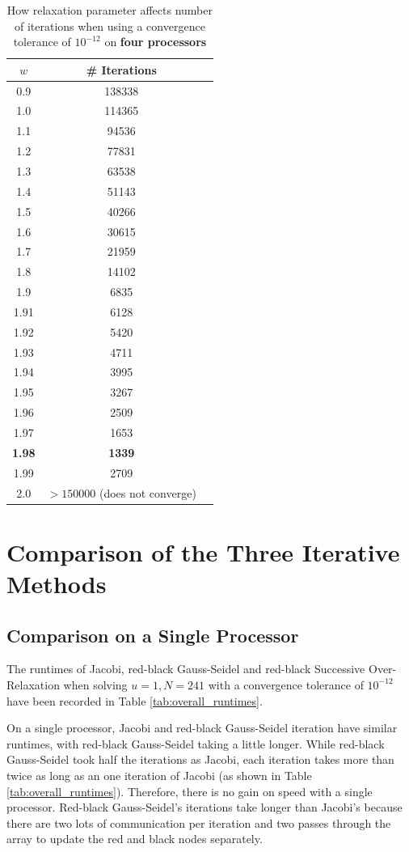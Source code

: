 \documentclass{article}
\begin{document}
\begin{table}
	\centering
	\begin{tabular}{|c|c|c|}
		\hline
		\textbf{$w$} & \textbf{\# Iterations} \\
		\hline
		0.9 & 138338 \\
		1.0 & 114365 \\
		1.1 & 94536 \\
		1.2 & 77831 \\
		1.3 & 63538 \\
		1.4 & 51143 \\
		1.5 & 40266 \\
		1.6 & 30615 \\
		1.7 & 21959 \\
		1.8 & 14102 \\
		1.9 & 6835 \\
		1.91 & 6128 \\
		1.92 & 5420 \\
		1.93 & 4711 \\
		1.94 & 3995 \\
		1.95 & 3267 \\
		1.96 & 2509 \\
		1.97 & 1653 \\
		\textbf{1.98} & \textbf{1339} \\
		1.99 & 2709 \\
		2.0 & $> 150000$ (does not converge) \\
		\hline
	\end{tabular}
	\caption{How relaxation parameter affects number of iterations when using a convergence tolerance of $10^{-12}$ on \textbf{four processors}}
	\label{tab:sor_relaxation_parameter_multiple_proc}
\end{table}

\section{Comparison of the Three Iterative Methods}

\subsection{Comparison on a Single Processor}

The runtimes of Jacobi, red-black Gauss-Seidel and red-black Successive Over-Relaxation when solving $u = 1, N = 241$ with a convergence tolerance of $10^{-12}$ have been recorded in Table \ref{tab:overall_runtimes}.

On a single processor, Jacobi and red-black Gauss-Seidel iteration have similar runtimes, with red-black Gauss-Seidel taking a little longer. While red-black Gauss-Seidel took half the iterations as Jacobi, each iteration takes more than twice as long as an one iteration of Jacobi (as shown in Table \ref{tab:overall_runtimes}). Therefore, there is no gain on speed with a single processor. Red-black Gauss-Seidel's iterations take longer than Jacobi's because there are two lots of communication per iteration and two passes through the array to update the red and black nodes separately.
\end{document}
